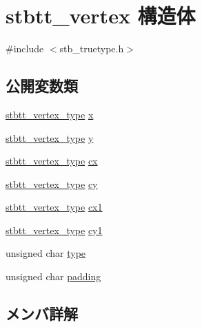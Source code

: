 \hypertarget{structstbtt__vertex}{}\section{stbtt\+\_\+vertex 構造体}
\label{structstbtt__vertex}


{\ttfamily \#include $<$stb\+\_\+truetype.\+h$>$}

\subsection*{公開変数類}
\begin{DoxyCompactItemize}
\item 
\mbox{\hyperlink{stb__truetype_8h_ab8fd8e5e0b82b0f7da54532035e47b22}{stbtt\+\_\+vertex\+\_\+type}} \mbox{\hyperlink{structstbtt__vertex_a81773edbe760d0e090561a3c1e86c919}{x}}
\item 
\mbox{\hyperlink{stb__truetype_8h_ab8fd8e5e0b82b0f7da54532035e47b22}{stbtt\+\_\+vertex\+\_\+type}} \mbox{\hyperlink{structstbtt__vertex_a9052065ca544b63d537325b246928cfc}{y}}
\item 
\mbox{\hyperlink{stb__truetype_8h_ab8fd8e5e0b82b0f7da54532035e47b22}{stbtt\+\_\+vertex\+\_\+type}} \mbox{\hyperlink{structstbtt__vertex_a43835489e2a151b31cb100d20f8adeae}{cx}}
\item 
\mbox{\hyperlink{stb__truetype_8h_ab8fd8e5e0b82b0f7da54532035e47b22}{stbtt\+\_\+vertex\+\_\+type}} \mbox{\hyperlink{structstbtt__vertex_a5610d6335aa6962d970fc7fd2225545e}{cy}}
\item 
\mbox{\hyperlink{stb__truetype_8h_ab8fd8e5e0b82b0f7da54532035e47b22}{stbtt\+\_\+vertex\+\_\+type}} \mbox{\hyperlink{structstbtt__vertex_a1c45a8d41727b24b84f97a944f2b800a}{cx1}}
\item 
\mbox{\hyperlink{stb__truetype_8h_ab8fd8e5e0b82b0f7da54532035e47b22}{stbtt\+\_\+vertex\+\_\+type}} \mbox{\hyperlink{structstbtt__vertex_a68227d28643f5667064fa3c385f4ea7d}{cy1}}
\item 
unsigned char \mbox{\hyperlink{structstbtt__vertex_aa325b3707b88e7e104c0de46bb2bf395}{type}}
\item 
unsigned char \mbox{\hyperlink{structstbtt__vertex_a8bd328747e8ea018612960a52e3e3ede}{padding}}
\end{DoxyCompactItemize}


\subsection{メンバ詳解}
\mbox{\label{structstbtt__vertex_a43835489e2a151b31cb100d20f8adeae}} 
